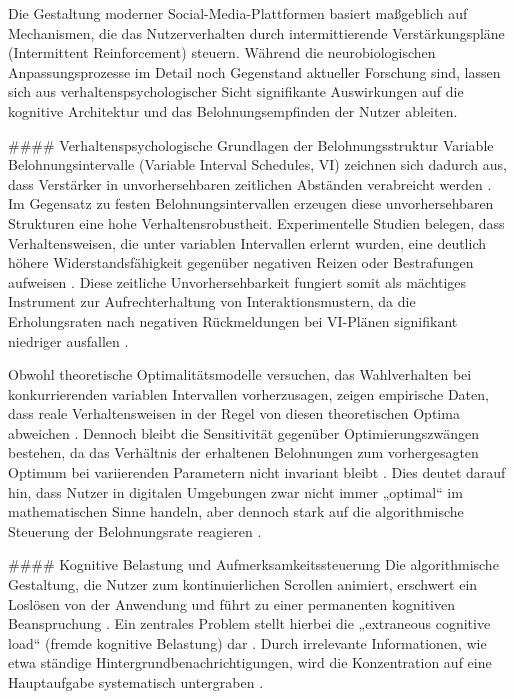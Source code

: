 \documentclass[11pt,a4paper]{article}
\begin{document}
Die Gestaltung moderner Social-Media-Plattformen basiert maßgeblich auf Mechanismen, die das Nutzerverhalten durch intermittierende Verstärkungspläne (Intermittent Reinforcement) steuern. Während die neurobiologischen Anpassungsprozesse im Detail noch Gegenstand aktueller Forschung sind, lassen sich aus verhaltenspsychologischer Sicht signifikante Auswirkungen auf die kognitive Architektur und das Belohnungsempfinden der Nutzer ableiten.

\#\#\#\# Verhaltenspsychologische Grundlagen der Belohnungsstruktur Variable Belohnungsintervalle (Variable Interval Schedules, VI) zeichnen sich dadurch aus, dass Verstärker in unvorhersehbaren zeitlichen Abständen verabreicht werden \autocite{crossref_10_3758_bf03343141}. Im Gegensatz zu festen Belohnungsintervallen erzeugen diese unvorhersehbaren Strukturen eine hohe Verhaltensrobustheit. Experimentelle Studien belegen, dass Verhaltensweisen, die unter variablen Intervallen erlernt wurden, eine deutlich höhere Widerstandsfähigkeit gegenüber negativen Reizen oder Bestrafungen aufweisen \autocite{crossref_10_3758_bf03343141}. Diese zeitliche Unvorhersehbarkeit fungiert somit als mächtiges Instrument zur Aufrechterhaltung von Interaktionsmustern, da die Erholungsraten nach negativen Rückmeldungen bei VI-Plänen signifikant niedriger ausfallen \autocite{crossref_10_3758_bf03343141,crossref_10_3758_bf03209807}.

Obwohl theoretische Optimalitätsmodelle versuchen, das Wahlverhalten bei konkurrierenden variablen Intervallen vorherzusagen, zeigen empirische Daten, dass reale Verhaltensweisen in der Regel von diesen theoretischen Optima abweichen \autocite{crossref_10_3758_bf03209807}. Dennoch bleibt die Sensitivität gegenüber Optimierungszwängen bestehen, da das Verhältnis der erhaltenen Belohnungen zum vorhergesagten Optimum bei variierenden Parametern nicht invariant bleibt \autocite{crossref_10_3758_bf03209807}. Dies deutet darauf hin, dass Nutzer in digitalen Umgebungen zwar nicht immer „optimal“ im mathematischen Sinne handeln, aber dennoch stark auf die algorithmische Steuerung der Belohnungsrate reagieren \autocite{crossref_10_3758_bf03209807}.

\#\#\#\# Kognitive Belastung und Aufmerksamkeitssteuerung Die algorithmische Gestaltung, die Nutzer zum kontinuierlichen Scrollen animiert, erschwert ein Loslösen von der Anwendung und führt zu einer permanenten kognitiven Beanspruchung \autocite{grey_grey_3467cac0f11d4b1e86319128da218a3e}. Ein zentrales Problem stellt hierbei die „extraneous cognitive load“ (fremde kognitive Belastung) dar \autocite{grey_grey_d4bc9c0d0e8441ba90398520e73af07d}. Durch irrelevante Informationen, wie etwa ständige Hintergrundbenachrichtigungen, wird die Konzentration auf eine Hauptaufgabe systematisch untergraben \autocite{grey_grey_d4bc9c0d0e8441ba90398520e73af07d}.
\end{document}

